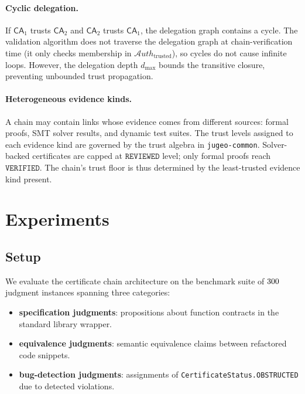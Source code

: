 \documentclass[11pt]{article}
\newcommand{\CA}{\mathsf{CA}}                  %
\newcommand{\AuthSet}{\mathcal{A}\!\mathit{uth}} %
\begin{document}
\paragraph{Cyclic delegation.}
If $\CA_1$ trusts $\CA_2$ and $\CA_2$ trusts $\CA_1$, the delegation
graph contains a cycle.  The validation algorithm does not traverse
the delegation graph at chain-verification time (it only checks
membership in $\AuthSet_{\mathrm{trusted}}$), so cycles do not cause
infinite loops.  However, the delegation depth $d_{\max}$ bounds
the transitive closure, preventing unbounded trust propagation.

\paragraph{Heterogeneous evidence kinds.}
A chain may contain links whose evidence comes from different sources:
formal proofs, SMT solver results, and dynamic test suites.  The trust
levels assigned to each evidence kind are governed by the trust algebra
in \texttt{jugeo-common}.  Solver-backed certificates are capped at
$\texttt{REVIEWED}$ level; only formal proofs reach $\texttt{VERIFIED}$.
The chain's trust floor is thus determined by the least-trusted evidence
kind present.

\section{Experiments}\label{sec:experiments}

\subsection{Setup}

We evaluate the certificate chain architecture on the \JuGeo{}
benchmark suite of $300{}$ judgment instances spanning
three categories:
\begin{itemize}
  \item \textbf{\numspec{} specification judgments}: propositions about
        function contracts in the standard library wrapper.
  \item \textbf{\numeq{} equivalence judgments}: semantic equivalence
        claims between refactored code snippets.
  \item \textbf{\numbug{} bug-detection judgments}: assignments of
        \texttt{CertificateStatus.OBSTRUCTED} due to detected violations.
\end{itemize}
\end{document}
